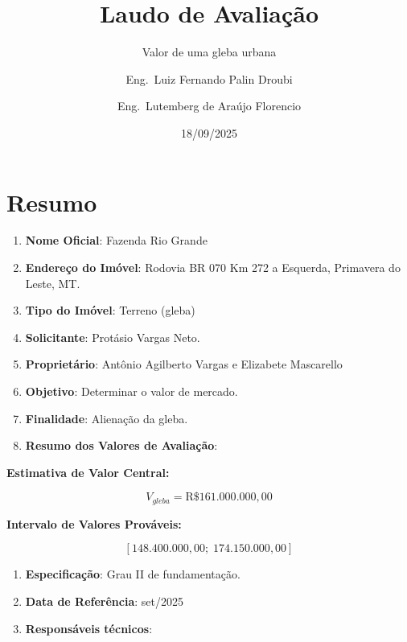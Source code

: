 \documentclass[
  10pt,
  a4paper]{article}
\title{Laudo de Avaliação}
\subtitle{Valor de uma gleba urbana}
\author{Eng.\textordmasculine~Luiz Fernando Palin
Droubi \and Eng.\textordmasculine~Lutemberg de Araújo Florencio}
\date{18/09/2025}
\begin{document}
\maketitle

\thispagestyle{fancy}

{
\hypersetup{linkcolor=}
\setcounter{tocdepth}{2}
\tableofcontents
}
\newpage

\section*{Resumo}\label{resumo}

\begin{enumerate}
\def\labelenumi{\arabic{enumi}.}
\item
  \textbf{Nome Oficial}: Fazenda Rio Grande
\item
  \textbf{Endereço do Imóvel}: Rodovia BR 070 Km 272 a Esquerda,
  Primavera do Leste, MT.
\item
  \textbf{Tipo do Imóvel}: Terreno (gleba)
\item
  \textbf{Solicitante}: Protásio Vargas Neto.
\item
  \textbf{Proprietário}: Antônio Agilberto Vargas e Elizabete Mascarello
\item
  \textbf{Objetivo}: Determinar o valor de mercado.
\item
  \textbf{Finalidade}: Alienação da gleba.
\item
  \textbf{Resumo dos Valores de Avaliação}:
\end{enumerate}

\begin{center}
\textbf{Estimativa de Valor Central:}
\end{center}

\[V_{gleba} = \text{R\$ }161.000.000,00 \]

\begin{center}
\vspace*{2\baselineskip}
\textbf{Intervalo de Valores Prováveis:}
\end{center}

\[[148.400.000,00; \;174.150.000,00]\]

\begin{enumerate}
\def\labelenumi{\arabic{enumi}.}
\setcounter{enumi}{8}
\item
  \textbf{Especificação}: Grau II de fundamentação.
\item
  \textbf{Data de Referência}: set/2025
\item
  \textbf{Responsáveis técnicos}: \theauthor
\end{enumerate}
\end{document}
